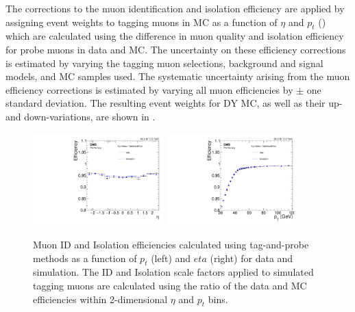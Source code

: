 The corrections to the muon identification and isolation efficiency are applied by assigning event weights to tagging muons in MC as a function of $\eta$ and $p_t$ () which are calculated using the difference in muon quality and isolation efficiency for probe muons in data and MC. 
The uncertainty on these efficiency corrections is estimated by varying the tagging muon selections, background and signal models, and MC samples used. 
The systematic uncertainty arising from the muon efficiency corrections is estimated by varying all muon efficiencies by $\pm$ one standard deviation.
The resulting event weights for DY MC, as well as their up- and down-variations, are shown in .

\begin{figure}[htbp]
	\centering
	\includegraphics[width=0.45\textwidth]{figures/muonEtaEff.pdf}
        \hspace{0.01\textwidth}
        \includegraphics[width=0.45\textwidth]{figures/muonPtEff.pdf}
	\caption[Muon ID and Isolation Effiencies]{Muon ID and Isolation efficiencies calculated using tag-and-probe methods as a function of $p_t$ (left) and $eta$ (right) for data and simulation. The ID and Isolation scale factors applied to simulated tagging muons are calculated using the ratio of the data and MC efficiencies within 2-dimensional $\eta$ and $p_t$ bins.}
        \label{fig:muIdIsoEff}
\end{figure}

